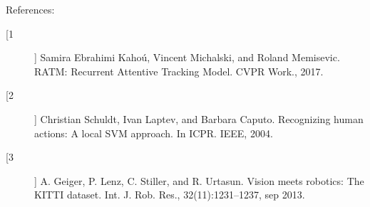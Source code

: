 
\vspace{.5\baselineskip}

{\large References:}
{\small
\begin{description}
    \item[[1]] Samira Ebrahimi Kahoú, Vincent Michalski, and Roland Memisevic. RATM: Recurrent Attentive Tracking Model. CVPR Work., 2017.
    \item[[2]] Christian Schuldt, Ivan Laptev, and Barbara Caputo. Recognizing human actions: A local SVM approach. In ICPR. IEEE, 2004.
    \item[[3]] A. Geiger, P. Lenz, C. Stiller, and R. Urtasun. Vision meets robotics: The KITTI dataset. Int. J. Rob. Res.,
    32(11):1231–1237, sep 2013.
\end{description}
}